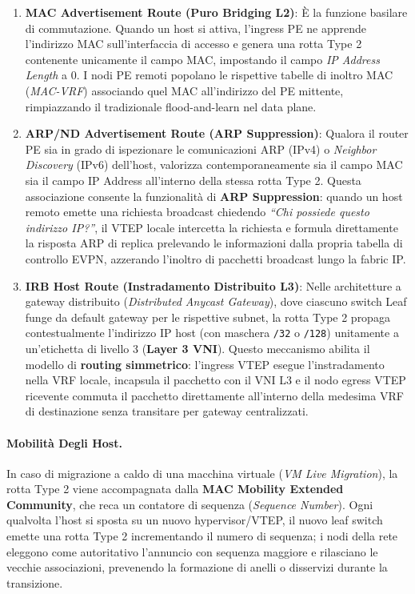 \documentclass[11pt, a4paper]{article}
\begin{document}
\begin{enumerate}
    \item \textbf{MAC Advertisement Route (Puro Bridging L2)}:
    È la funzione basilare di commutazione. Quando un host si attiva, l'ingress PE ne apprende l'indirizzo MAC sull'interfaccia di accesso e genera una rotta Type 2 contenente unicamente il campo MAC, impostando il campo \emph{IP Address Length} a $0$. I nodi PE remoti popolano le rispettive tabelle di inoltro MAC (\emph{MAC-VRF}) associando quel MAC all'indirizzo del PE mittente, rimpiazzando il tradizionale flood-and-learn nel data plane.

    \item \textbf{ARP/ND Advertisement Route (ARP Suppression)}:
    Qualora il router PE sia in grado di ispezionare le comunicazioni ARP (IPv4) o \emph{Neighbor Discovery} (IPv6) dell'host, valorizza contemporaneamente sia il campo MAC sia il campo IP Address all'interno della stessa rotta Type 2.
    Questa associazione consente la funzionalità di \textbf{ARP Suppression}: quando un host remoto emette una richiesta broadcast chiedendo \emph{``Chi possiede questo indirizzo IP?''}, il VTEP locale intercetta la richiesta e formula direttamente la risposta ARP di replica prelevando le informazioni dalla propria tabella di controllo EVPN, azzerando l'inoltro di pacchetti broadcast lungo la fabric IP.

    \item \textbf{IRB Host Route (Instradamento Distribuito L3)}:
    Nelle architetture a gateway distribuito (\emph{Distributed Anycast Gateway}), dove ciascuno switch Leaf funge da default gateway per le rispettive subnet, la rotta Type 2 propaga contestualmente l'indirizzo IP host (con maschera \texttt{/32} o \texttt{/128}) unitamente a un'etichetta di livello 3 (\textbf{Layer 3 VNI}). Questo meccanismo abilita il modello di \textbf{routing simmetrico}: l'ingress VTEP esegue l'instradamento nella VRF locale, incapsula il pacchetto con il VNI L3 e il nodo egress VTEP ricevente commuta il pacchetto direttamente all'interno della medesima VRF di destinazione senza transitare per gateway centralizzati.
\end{enumerate}

\paragraph{Mobilità Degli Host.}
In caso di migrazione a caldo di una macchina virtuale (\emph{VM Live Migration}), la rotta Type 2 viene accompagnata dalla \textbf{MAC Mobility Extended Community}, che reca un contatore di sequenza (\emph{Sequence Number}). Ogni qualvolta l'host si sposta su un nuovo hypervisor/VTEP, il nuovo leaf switch emette una rotta Type 2 incrementando il numero di sequenza; i nodi della rete eleggono come autoritativo l'annuncio con sequenza maggiore e rilasciano le vecchie associazioni, prevenendo la formazione di anelli o disservizi durante la transizione.
\end{document}
